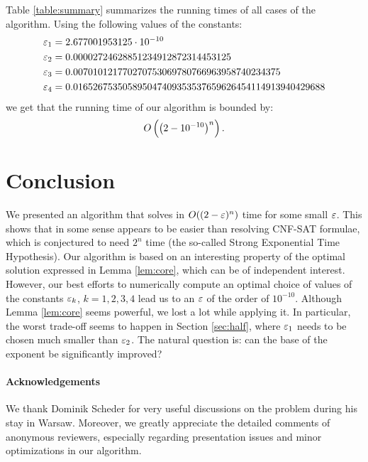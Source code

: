 \documentclass{article}
\theoremstyle{definition}
\begin{document}
Table \ref{table:summary} summarizes the running times of all cases of the algorithm.
Using the following values of the constants:
\begin{align*}
\varepsilon_1 &= 2.677001953125 \cdot 10^{-10} \\
\varepsilon_2 &=  0.00002724628851234912872314453125 \\
\varepsilon_3 &=  0.007010121770270753069780766963958740234375 \\
\varepsilon_4 &=  0.016526753505895047409353537659626454114913940429688 \\
\end{align*}
we get that the running time of our algorithm is bounded by:
$$O\left(\left(2- 10^{-10}\right)^n\right).$$


\section{Conclusion}\label{sec:conc}

We presented an algorithm that solves \schedname{} in $O((2-\varepsilon)^n)$ time for some small $\varepsilon$.
This shows that in some sense \schedname{} appears to be easier than resolving CNF-SAT formulae, which is conjectured to need $2^n$ time (the so-called Strong Exponential Time Hypothesis).
Our algorithm is based on an interesting property of the optimal solution expressed in Lemma \ref{lem:core}, which can be of independent interest.
However, our best efforts to numerically compute an optimal choice of values of the constants $\varepsilon_k$, $k=1,2,3,4$ lead us
to an $\varepsilon$ of the order of $10^{-10}$. Although Lemma \ref{lem:core} seems powerful, we lost a lot while applying it. In particular,
the worst trade-off seems to happen in Section \ref{sec:half}, where $\varepsilon_1$ needs to be chosen much smaller than $\varepsilon_2$.
The natural question is: can the base of the exponent be significantly improved?

\paragraph{Acknowledgements} We thank Dominik Scheder for very useful discussions on the \schedname{} problem during his stay in Warsaw. 
Moreover, we greatly appreciate the detailed comments of anonymous reviewers, especially regarding presentation issues and minor optimizations in our algorithm.



\end{document}
